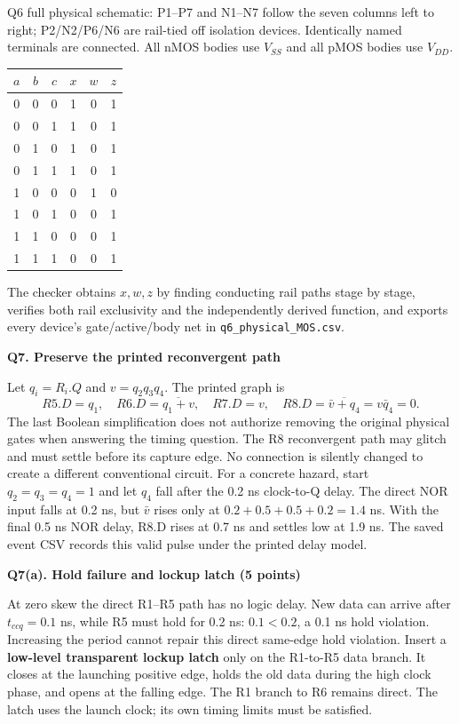 \documentclass[10pt]{article}
\newcommand{\qheading}[1]{\par\medskip\textbf{#1}\par}
\begin{document}
\small Q6 full physical schematic: P1--P7 and N1--N7 follow the seven columns left to right; P2/N2/P6/N6 are rail-tied off isolation devices. Identically named terminals are connected. All nMOS bodies use $V_{SS}$ and all pMOS bodies use $V_{DD}$.\normalsize\par
\begin{center}\begin{tabular}{cccccc}\toprule
$a$&$b$&$c$&$x$&$w$&$z$\\\midrule
0&0&0&1&0&1\\0&0&1&1&0&1\\0&1&0&1&0&1\\0&1&1&1&0&1\\
1&0&0&0&1&0\\1&0&1&0&0&1\\1&1&0&0&0&1\\1&1&1&0&0&1\\\bottomrule
\end{tabular}\end{center}
The checker obtains $x,w,z$ by finding conducting rail paths stage by stage, verifies both rail exclusivity and the independently derived function, and exports every device's gate/active/body net in \texttt{q6\_physical\_MOS.csv}.
\qheading{Q7. Preserve the printed reconvergent path}
Let $q_i=R_i.Q$ and $v=q_2q_3q_4$. The printed graph is
\[
R5.D=q_1,\quad R6.D=\overline{q_1+v},\quad R7.D=v,\quad
R8.D=\overline{\bar v+q_4}=v\bar q_4=0.
\]
The last Boolean simplification does not authorize removing the original physical gates when answering the timing question. The R8 reconvergent path may glitch and must settle before its capture edge. No connection is silently changed to create a different conventional circuit.
For a concrete hazard, start $q_2=q_3=q_4=1$ and let $q_4$ fall after the 0.2 ns clock-to-Q delay. The direct NOR input falls at 0.2 ns, but $\bar v$ rises only at $0.2+0.5+0.5+0.2=1.4$ ns. With the final 0.5 ns NOR delay, R8.D rises at 0.7 ns and settles low at 1.9 ns. The saved event CSV records this valid pulse under the printed delay model.
\newpage
\qheading{Q7(a). Hold failure and lockup latch (5 points)}
At zero skew the direct R1--R5 path has no logic delay. New data can arrive after $t_{ccq}=0.1$ ns, while R5 must hold for 0.2 ns: $0.1<0.2$, a 0.1 ns hold violation. Increasing the period cannot repair this direct same-edge hold violation.
Insert a \textbf{low-level transparent lockup latch} only on the R1-to-R5 data branch. It closes at the launching positive edge, holds the old data during the high clock phase, and opens at the falling edge. The R1 branch to R6 remains direct. The latch uses the launch clock; its own timing limits must be satisfied.
\end{document}
